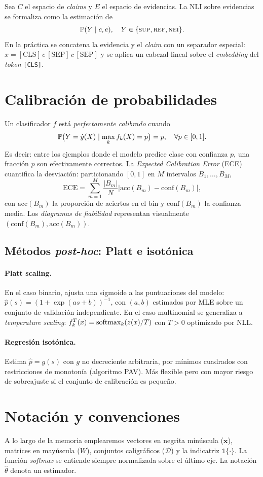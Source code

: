 Sea $C$ el espacio de \emph{claims} y $E$ el espacio de evidencias. La
NLI sobre evidencias se formaliza como la estimación de
\[
  \mathbb{P}(Y \mid c, e), \quad
  Y \in \{\textsc{sup}, \textsc{ref}, \textsc{nei}\}.
\]
En la práctica se concatena la evidencia y el \emph{claim} con un
separador especial: $x = [\text{CLS}]\,e\,[\text{SEP}]\,c\,[\text{SEP}]$
y se aplica un cabezal lineal sobre el \emph{embedding} del \emph{token}
\texttt{[CLS]}.

\section{Calibración de probabilidades}

Un clasificador $f$ está \emph{perfectamente calibrado} cuando
\[
  \mathbb{P}\bigl(Y = \hat{y}(X) \mid \max_k f_k(X) = p\bigr) = p,
  \quad \forall p \in [0, 1].
\]
Es decir: entre los ejemplos donde el modelo predice clase con
confianza $p$, una fracción $p$ son efectivamente correctos. La
\emph{Expected Calibration Error} (ECE) cuantifica la desviación:
particionando $[0,1]$ en $M$ intervalos $B_1, \dots, B_M$,
\[
  \mathrm{ECE} = \sum_{m=1}^M \frac{|B_m|}{N}
  \bigl| \mathrm{acc}(B_m) - \mathrm{conf}(B_m) \bigr|,
\]
con $\mathrm{acc}(B_m)$ la proporción de aciertos en el bin y
$\mathrm{conf}(B_m)$ la confianza media. Los \emph{diagramas de
fiabilidad} representan visualmente $(\mathrm{conf}(B_m),
\mathrm{acc}(B_m))$.

\subsection{Métodos \emph{post-hoc}: Platt e isotónica}

\paragraph{Platt scaling.} En el caso binario, ajusta una sigmoide a las
puntuaciones del modelo:
$\hat{p}(s) = (1 + \exp(a s + b))^{-1}$, con $(a, b)$ estimados por MLE
sobre un conjunto de validación independiente. En el caso multinomial
se generaliza a \emph{temperature scaling}: $f^T_k(x) =
\operatorname{softmax}_k(z(x) / T)$ con $T > 0$ optimizado por NLL.

\paragraph{Regresión isotónica.} Estima $\hat{p} = g(s)$ con $g$ no
decreciente arbitraria, por mínimos cuadrados con restricciones de
monotonía (algoritmo PAV). Más flexible pero con mayor riesgo de
sobreajuste si el conjunto de calibración es pequeño.

\section{Notación y convenciones}

A lo largo de la memoria emplearemos vectores en negrita minúscula
($\mathbf{x}$), matrices en mayúscula ($W$), conjuntos caligráficos
($\mathcal{D}$) y la indicatriz $\mathbb{1}\{\cdot\}$. La función
\emph{softmax} se entiende siempre normalizada sobre el último eje. La
notación $\hat\theta$ denota un estimador.
